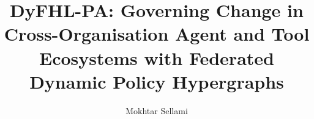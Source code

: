 \documentclass[preprint,12pt,a4paper]{elsarticle}
\theoremstyle{definition}
\theoremstyle{remark}
\newcommand{\name}{DyFHL-PA}
\begin{document}
\begin{frontmatter}
\title{\name: Governing Change in Cross-Organisation Agent and Tool Ecosystems with Federated Dynamic Policy Hypergraphs}

\author[riadi]{Mokhtar Sellami}
\address[riadi]{RIADI Laboratory, National School of Computer Science (ENSI), University of Manouba, Manouba, Tunisia}


\end{frontmatter}













\end{document}

